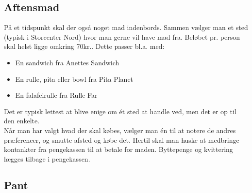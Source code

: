 \subsection{Aftensmad}
\label{sec:intra:aftensmad}
På et tidspunkt skal der også noget mad indenbords. 
Sammen vælger man et sted (typisk i Storcenter Nord) 
hvor man gerne vil have mad fra.
Beløbet pr. person skal helst ligge omkring 70kr..
Dette passer bl.a. med:
\begin{itemize}
    \item En sandwich fra Anettes Sandwich
    \item En rulle, pita eller bowl fra Pita Planet
    \item En falafelrulle fra Rulle Far
\end{itemize}
Det er typisk lettest at blive enige om ét sted at handle ved, 
men det er op til den enkelte.\\
Når man har valgt hvad der skal købes, 
vælger man én til at notere de andres præferencer, 
og smutte afsted og købe det.
Hertil skal man huske at medbringe kontankter fra pengekassen til at betale for maden. 
Byttepenge og kvittering lægges tilbage i pengekassen.

\subsection{Pant}
\label{sec:intra:pant}

